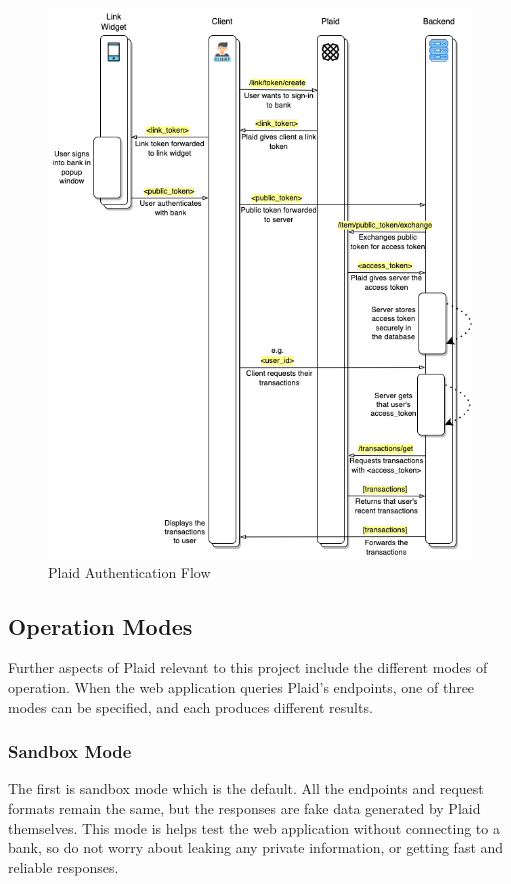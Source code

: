 \begin{figure}[H]
	\centering
    \includegraphics[width=\textwidth]{Plaid_auth_flow_sequence_diagram.png}
    \caption{Plaid Authentication Flow}
    \label{fig:plaid_auth_flow}
\end{figure}

\subsection{Operation Modes}
Further aspects of Plaid relevant to this project include the different modes of operation. When the web application queries Plaid's endpoints, one of three modes can be specified, and each produces different results. 

\subsubsection{Sandbox Mode}
The first is sandbox mode which is the default. All the endpoints and request formats remain the same, but the responses are fake data generated by Plaid themselves. This mode is helps test the web application without connecting to a bank, so do not worry about leaking any private information, or getting fast and reliable responses. 

